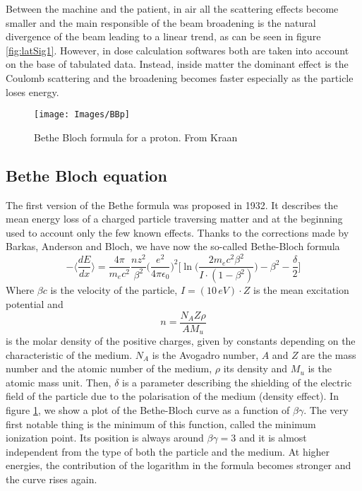 \documentclass[12pt, a4paper, twoside]{book}
\begin{document}
Between the machine and the patient, in air all the scattering effects become smaller and the main responsible of the beam broadening is the natural divergence of the beam leading to a linear trend, as can be seen in figure \ref{fig:latSig1}.
However, in dose calculation softwares both are taken into account on the base of tabulated data. Instead, inside matter the dominant effect is the Coulomb scattering and the broadening becomes faster especially as the particle loses energy.

\begin{figure}[!ht]
{\texttt{[image: Images/BBp]}}
\caption{Bethe Bloch formula for a proton. From Kraan \cite{Kra:range}}
\label{fig:BB}
\end{figure}

\subsection{Bethe Bloch equation}
The first version of the Bethe formula was proposed in 1932. It describes the mean energy loss of a charged particle traversing matter and at the beginning used to account only the few known effects.
Thanks to the corrections made by Barkas, Anderson and Bloch, we have now the so-called Bethe-Bloch formula
\[
-\bigg\langle\frac{dE}{dx}\bigg\rangle= \frac{4\pi}{m_ec^2}\frac{nz^2}{\beta^2}\bigg(\frac{e^2}{4\pi\epsilon_0} \bigg)^2\bigg[\ln{\bigg(\frac{2m_ec^2\beta^2}{I\cdot(1-\beta^2)}\bigg)}-\beta^2 -\frac{\delta}{2}\bigg]
\]
Where $\beta c$ is the velocity of the particle, $I=(10\,eV)\cdot Z$ is the mean excitation potential and 
\[
n = \frac{N_AZ\rho}{AM_u}
\]
is the molar density of the positive charges, given by constants depending on the characteristic of the medium. $N_A$ is the Avogadro number, $A$ and $Z$ are the mass number and the atomic number of the medium, $\rho$ its density and $M_u$ is the atomic mass unit. Then, $\delta$ is a parameter describing the shielding of the electric field of the particle due to the polarisation of the medium (density effect).
In figure \ref{fig:BB}, we show a plot of the Bethe-Bloch curve as a function of $\beta\gamma$. The very first notable thing is the minimum of this function, called the minimum ionization point. Its position is always around $\beta\gamma=3$ and it is almost independent from the type of both the particle and the medium. At higher energies, the contribution of the logarithm in the formula becomes stronger and the curve rises again.
\end{document}
